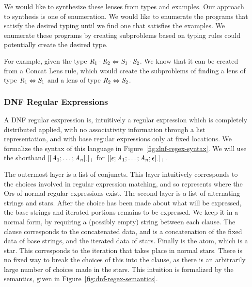 We would like to synthesize these lenses from types and examples.
Our approach to synthesis is one of enumeration.
We would like to enumerate the programs that satisfy the desired typing until
we find one that satisfies the examples.
We enumerate these programs by creating subproblems based on typing rules
could potentially create the desired type.

For example, given the type $\mathit{R}_1\cdot\mathit{R}_2\Leftrightarrow\mathit{S}_1\cdot\mathit{S}_2$.
We know that it can be created from a Concat Lens rule,
which would create the subproblems of finding a lens of type $\mathit{R}_1\Leftrightarrow\mathit{S}_1$
and a lens of type $\mathit{R}_2\Leftrightarrow\mathit{S}_2$.

\subsubsection{DNF Regular Expressions}


A DNF regular esxpression is, intuitively
a regular expression which is completely distributed
applied, with no associativity information through a list representation,
and with base regular expressions only at fixed locations.
We formalize the syntax of this language in Figure~\ref{fig:dnf-regex-syntax}.
We will use the shorthand $[[\mathit{A}_1;\ldots;\mathit{A}_n]_{\cdot}]_{+}$
for $[[\epsilon;\mathit{A}_1;\ldots;\mathit{A}_n;\epsilon]_{\cdot}]_{+}$.

The outermost layer is a list of conjuncts.
This layer intuitively corresponds to the choices involved in regular expression matching, and so represents where the Ors of normal regular expressions exist.
The second layer is a list of alternating strings and stars.
After the choice has been made about what will be expressed,
the base strings and iterated portions remains to be expressed.
We keep it in a normal form, by requiring a (possibly empty) string between
each clause.
The clause corresponds to the concatenated data, and is a concatenation of the
fixed data of base strings, and the iterated data of stars.
Finally is the atom, which is a star.
This corresponds to the iteration that takes place in normal stars.
There is no fixed way to break the choices of this into the clause,
as there is an arbitrarily large number of choices made in the stars.
This intuition is formalized by the semantics, given in Figure~\ref{fig:dnf-regex-semantics}.

